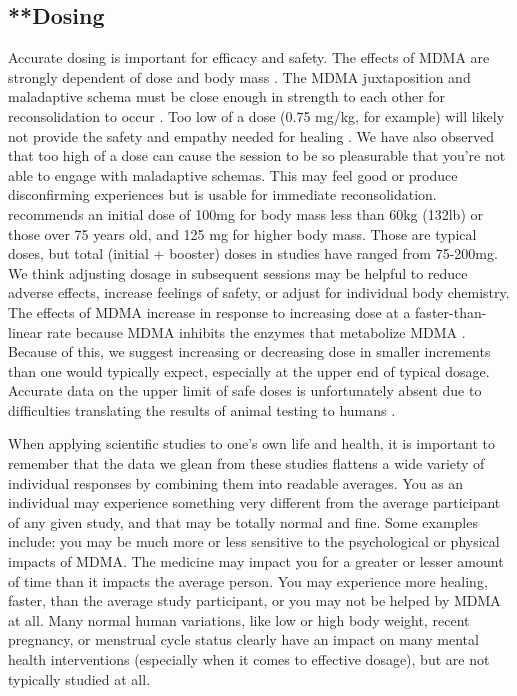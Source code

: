 \documentclass[12pt,letterpaper]{article}
\begin{document}
\subsection{**Dosing}
\label{sec:dosing}
Accurate dosing is important for efficacy and safety. The effects of MDMA are strongly dependent of dose and body mass \cite{studerusResponse}. The MDMA juxtaposition and maladaptive schema must be close enough in strength to each other for reconsolidation to occur \cite{eckerUnlocking}. Too low of a dose (0.75 mg/kg, for example) will likely not provide the safety and empathy needed for healing \cite{bediMDMALowDose}. We have also observed that too high of a dose can cause the session to be so pleasurable that you're not able to engage with maladaptive schemas. This may feel good or produce disconfirming experiences but is usable for immediate reconsolidation. \textcite{liechtiInteractions} recommends an initial dose of 100mg for body mass less than 60kg (132lb) or those over 75 years old, and 125 mg for higher body mass. Those are typical doses, but total (initial + booster) doses in studies have ranged from 75-200mg. We think adjusting dosage in subsequent sessions may be helpful to reduce adverse effects, increase feelings of safety, or adjust for individual body chemistry. The effects of MDMA increase in response to increasing dose at a faster-than-linear rate because MDMA inhibits the enzymes that metabolize MDMA \cite{de2000nonlinear}. Because of this, we suggest increasing or decreasing dose in smaller increments than one would typically expect, especially at the upper end of typical dosage. Accurate data on the upper limit of safe doses is unfortunately absent due to difficulties translating the results of animal testing to humans \cite{passieHistory}.

When applying scientific studies to one's own life and health, it is important to remember that the data we glean from these studies flattens a wide variety of individual responses by combining them into readable averages. You as an individual may experience something very different from the average participant of any given study, and that may be totally normal and fine. Some examples include: you may be much more or less sensitive to the psychological or physical impacts of MDMA. The medicine may impact you for a greater or lesser amount of time than it impacts the average person. You may experience more healing, faster, than the average study participant, or you may not be helped by MDMA at all. Many normal human variations, like low or high body weight, recent pregnancy, or menstrual cycle status clearly have an impact on many mental health interventions (especially when it comes to effective dosage), but are not typically studied at all.
\end{document}
